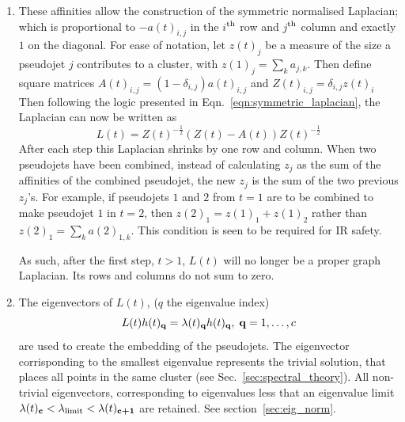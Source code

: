 \begin{enumerate}
\item\label{step:laplacean} These affinities allow the construction of the symmetric normalised
        Laplacian; which is proportional to \(-a(t)_{i, j}\)
        in the \(i\)$^{\rm th}$ row and \(j\)$^{\rm th}$ column and exactly \(1\) on the diagonal.
        For ease of notation, let \(z(t)_j\) be a measure of the size a pseudojet \(j\) contributes to a cluster,
        with \(z(1)_j = \sum_k a_{j,k}\).
        Then define square matrices \(A(t)_{i, j} = (1 - \delta_{i, j}) a(t)_{i, j}\) and \(Z(t)_{i, j} = \delta_{i, j} z(t)_i\)
        Then following the logic presented in Eqn.~\ref{eqn:symmetric_laplacian}, the Laplacian can now be written as
       \begin{equation}\label{eqn:Laplacian}
           L(t) = Z(t)^{-\frac{1}{2}}(Z(t) - A(t))Z(t)^{-\frac{1}{2}}
       \end{equation}
        After each step this Laplacian shrinks by one row and column.
        When two pseudojets have been combined, instead of calculating \(z_j\) as the sum of the affinities of the combined pseudojet,
        the new \(z_j\) is the sum of the two previous \(z_j\)'s.
        For example, if pseudojets \(1\) and \(2\) from \(t=1\) are to be combined to make pseudojet \(1\) in \(t=2\),
        then \(z(2)_{1} = z(1)_1 + z(1)_2\) rather than \(z(2)_{1} = \sum_k a(2)_{1, k} \).
        This condition is seen to be required for IR safety. 

        As such, after the first step, \(t > 1\),
        \(L(t)\) will no longer be a proper graph Laplacian.
        Its rows and columns do not sum to zero.

    \item \label{step:eigenvectors} The eigenvectors of $L(t)$, ($q$ the eigenvalue index)
            \begin{equation}
                L(t) h(t)_{\textbf{q}} = \lambda(t)_{\textbf{q}} h(t)_{\textbf{q}},  \; \textbf{q}=1, \ldots, c
            \end{equation}
            	are used to create the embedding of the pseudojets.
            The eigenvector corrisponding to the smallest eigenvalue represents the trivial solution,
            that places all points in the same cluster (see Sec.~\ref{sec:spectral_theory}).
            All non-trivial eigenvectors, corresponding
            to eigenvalues less that an eigenvalue limit \(\lambda(t)_{\textbf{c}} < \lambda_\text{limit} < \lambda(t)_{\textbf{c+1}}\)
            are retained. See section~\ref{sec:eig_norm}.


\end{enumerate}
